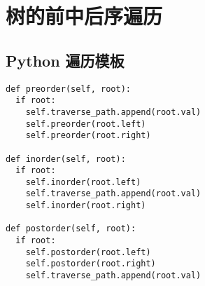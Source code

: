 \newpage
\section{树的前中后序遍历}

\subsection{Python 遍历模板}

\begin{verbatim}
def preorder(self, root):
  if root:
    self.traverse_path.append(root.val)
    self.preorder(root.left)
    self.preorder(root.right)

def inorder(self, root):
  if root:
    self.inorder(root.left)
    self.traverse_path.append(root.val)
    self.inorder(root.right)

def postorder(self, root):
  if root:
    self.postorder(root.left)
    self.postorder(root.right)
    self.traverse_path.append(root.val)
\end{verbatim}
